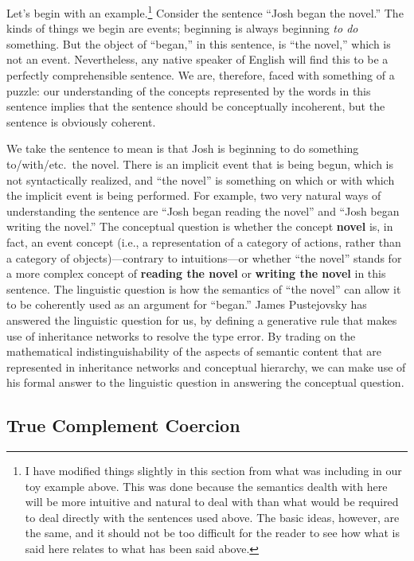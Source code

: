Let's begin with an example.\footnote{I have modified things slightly in this section from what was including in our toy example above. This was done because the semantics dealth with here will be more intuitive and natural to deal with than what would be required to deal directly with the sentences used above. The basic ideas, however, are the same, and it should not be too difficult for the reader to see how what is said here relates to what has been said above.} Consider the sentence ``Josh began the novel.'' The kinds of things we begin are events; beginning is always beginning \emph{to do} something. But the object of ``began,'' in this sentence, is ``the novel,'' which is not an event. Nevertheless, any native speaker of English will find this to be a perfectly comprehensible sentence. We are, therefore, faced with something of a puzzle: our understanding of the concepts represented by the words in this sentence implies that the sentence should be conceptually incoherent, but the sentence is obviously coherent.

We take the sentence to mean is that Josh is beginning to do something to/with/etc.\ the novel. There is an implicit event that is being begun, which is not syntactically realized, and ``the novel'' is something on which or with which the implicit event is being performed. For example, two very natural ways of understanding the sentence are ``Josh began reading the novel'' and ``Josh began writing the novel.'' The conceptual question is whether the concept {\bf novel} is, in fact, an event concept (i.e., a representation of a category of actions, rather than a category of objects)---contrary to intuitions---or whether ``the novel'' stands for a more complex concept of {\bf reading the novel} or {\bf writing the novel} in this sentence. The linguistic question is how the semantics of ``the novel'' can allow it to be coherently used as an argument for ``began.'' James Pustejovsky has answered the linguistic question for us, by defining a generative rule that makes use of inheritance networks to resolve the type error. By trading on the mathematical indistinguishability of the aspects of semantic content that are represented in inheritance networks and conceptual hierarchy, we can make use of his formal answer to the linguistic question in answering the conceptual question.

\subsection{True Complement Coercion}

